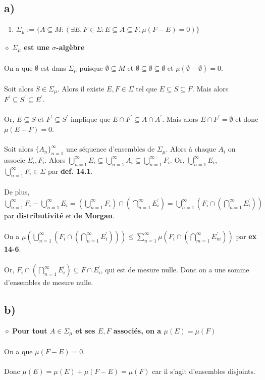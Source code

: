 \documentclass[a4paper,10pt]{article}
\begin{document}
\subsection*{a)}
\begin{enumerate}
	\item $\Sigma_\mu := \{A \subseteq M : (\exists E,F \in \Sigma : E \subseteq A \subseteq F, \mu(F - E) = 0) \}$
\end{enumerate}
$\diamond$ \textbf{$\Sigma_\mu$ est une $\sigma$-algèbre}
\\
\\
On a que $\emptyset$ est dans $\Sigma_\mu$ puisque $\emptyset \subseteq M$ et $\emptyset \subseteq \emptyset \subseteq \emptyset$ et $\mu (\emptyset - \emptyset) = 0$.
\\
\\
Soit alors $S \in \Sigma_\mu$. Alors il existe $E,F \in \Sigma$ tel que $E \subseteq S \subseteq F$. Mais alors $F^\prime \subseteq S^\prime \subseteq E^\prime$. 
\\
\\
Or, $E \subseteq S$ et $F^\prime \subseteq S^\prime$ implique que $E \cap F^\prime \subseteq A \cap A^\prime$. Mais alors $E \cap F^\prime = \emptyset$ et donc $\mu(E - F) = 0$.
\\
\\
Soit alors $\{A_n\}_{n=1}^\infty$ une séquence d'ensembles de $\Sigma_\mu$. Alors à chaque $A_i$ on associe $E_i, F_i$. Alors $\bigcup_{n=1}^\infty E_i \subseteq \bigcup_{n=1}^\infty A_i \subseteq \bigcup_{n=1}^\infty F_i$. Or, $\bigcup_{n=1}^\infty E_i$, $\bigcup_{n=1}^\infty F_i \in \Sigma$ par \textbf{def. 14.1}.
\\
\\
De plus, $\bigcup_{n=1}^\infty F_i - \bigcup_{n=1}^\infty E_i = (\bigcup_{n=1}^\infty F_i) \cap (\bigcap_{n=1}^\infty E_i^\prime) = \bigcup_{n=1}^\infty (F_i \cap (\bigcap_{n=1}^\infty E_i^\prime))$ par \textbf{distributivité} et \textbf{de Morgan}.
\\
\\
On a $\mu (\bigcup_{n=1}^\infty (F_i \cap (\bigcap_{n=1}^\infty E_i^\prime))) \leq \sum_{n=1}^\infty \mu(F_i \cap (\bigcap_{m=1}^\infty E_m^\prime))$ par \textbf{ex 14-6}.
\\
\\
Or, $F_i \cap (\bigcap_{n=1}^\infty E_i^\prime) \subseteq F \cap E_i^\prime$, qui est de mesure nulle. Donc on a une somme d'ensembles de mesure nulle. 

\subsection*{b)}
$\diamond$ \textbf{Pour tout $A \in \Sigma_\mu$ et ses $E,F$ associés, on a $\mu (E) = \mu (F)$}
\\
\\
On a que $\mu (F - E) = 0$.
\\
\\
Donc $\mu(E) = \mu(E) + \mu(F-E) = \mu(F)$ car il s'agit d'ensembles disjoints.
\end{document}
